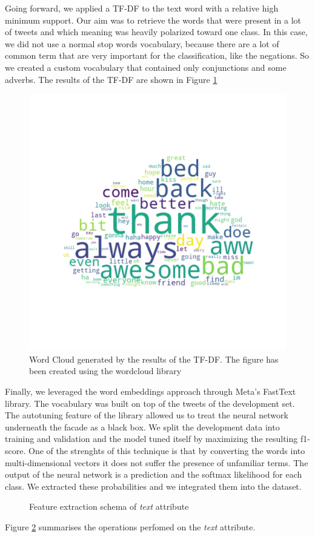 \documentclass[conference]{IEEEtran}
\begin{document}
Going forward, we applied a TF-DF to the text word with a relative high minimum support. Our aim was to retrieve the words that were present in a lot of tweets and which meaning was heavily polarized toward one class. In this case, we did not use a normal stop words vocabulary, because there are a lot of common term that are very important for the classification, like the negations. So we created a custom vocabulary that contained only conjunctions and some adverbs. The results of the TF-DF are shown in Figure \ref{fig:word_cloud}
\begin{figure}[h]
        \centering
        \includegraphics[width=\columnwidth]{word_cloud}
        \caption{Word Cloud generated by the results of the TF-DF. The figure has been created using the wordcloud library\cite{word_cloud}}
        \label{fig:word_cloud}
\end{figure}
Finally, we leveraged the word embeddings approach through Meta's FastText library. The vocabulary was built on top of the tweets of the development set. The autotuning feature of the library allowed us to treat the neural network underneath the facade as a black box. We split the development data into training and validation and the model tuned itself by maximizing the resulting f1-score. One of the strenghts of this technique is that by converting the words into multi-dimensional vectors it does not suffer the presence of unfamiliar terms. The output of the neural network is a prediction and the softmax likelihood for each class. We extracted these probabilities and we integrated them into the dataset.
\begin{figure}[h]
        \centering
        
        \caption{Feature extraction schema of \textit{text} attribute}
        \label{fig:text_schema}
\end{figure}
Figure \ref{fig:text_schema} summarises the operations perfomed on the \textit{text} attribute.
\end{document}

